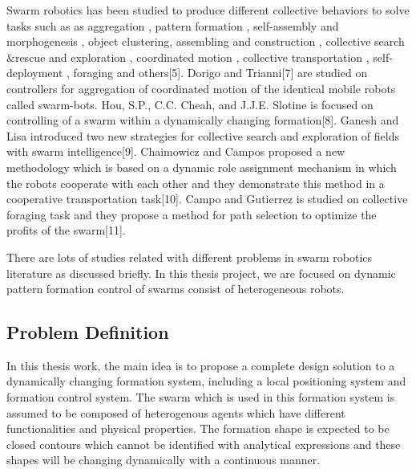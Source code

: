 \documentclass[twoside]{article}
\begin{document}
Swarm robotics has been studied to produce different collective behaviors to solve tasks such as as aggregation , pattern formation , self-assembly and morphogenesis , object clustering, assembling and construction , collective search$\&$rescue and exploration , coordinated motion , collective transportation , self-deployment , foraging and others[5]. Dorigo and Trianni[7] are studied on controllers for aggregation of coordinated motion of the identical mobile robots called swarm-bots.  Hou, S.P., C.C. Cheah, and J.J.E. Slotine is focused on controlling of a swarm within a dynamically changing formation[8]. Ganesh and Lisa introduced two new strategies for collective search and exploration of fields with swarm intelligence[9]. Chaimowicz and Campos proposed a new methodology which is based on a dynamic role assignment mechanism in which the robots cooperate with each other and they demonstrate this method in a cooperative transportation task[10].  Campo and Gutierrez is studied on collective foraging task and they propose a method for path selection to optimize the profits of the swarm[11].

There are lots of studies related with different problems in swarm robotics literature as discussed briefly. In this thesis project, we are focused on dynamic pattern formation control of swarms consist of heterogeneous robots.


\subsection{Problem Definition}
In this thesis work, the main idea is to propose a complete design solution to a dynamically changing formation system, including a local positioning system and formation control system. The swarm which is used in this formation system is assumed to be composed of heterogenous agents which have different functionalities and physical properties. The formation shape is expected to be closed contours which cannot be identified with analytical expressions and these shapes will be changing dynamically with a continuous manner. 
\end{document}
